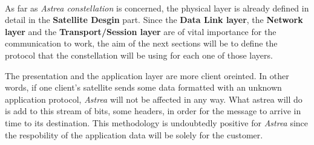 \paragraph{}
As far as \textit{Astrea constellation} is concerned, the physical layer is already defined in detail in the \textbf{Satellite Desgin} part. Since the\textbf{ Data Link layer}, the \textbf{Network layer} and the \textbf{Transport/Session layer} are of vital importance for the communication to work, the aim of the next sections will be to define the protocol that the constellation will be using for each one of those layers.

The presentation and the application layer are more client oreinted. In other words, if one client's satellite sends some data formatted with an unknown application protocol, \textit{Astrea} will not be affected in any way. What astrea will do is add to this stream of bits, some headers, in order for the message to arrive in time to its destination. This methodology is undoubtedly positive for \textit{Astrea} since the respobility of the application data will be solely for the customer.